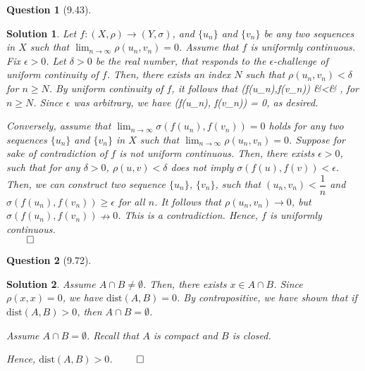 \documentclass{article} %
\def\eQb#1\eQe{\begin{eqnarray*}#1\end{eqnarray*}}
\theoremstyle{quest}
\newtheorem*{question}{Question}
\newtheorem*{solution}{Solution}
\begin{document}
\begin{question}[9.43]
\end{question}
\begin{solution}
Let $f:(X,\rho ) \to (Y, \sigma)$,
and $\{ u_n \}$ and 
$\{ v_n \}$ be any two sequences in $X$ such that $\lim_{n\to \infty}
\rho (u_n , v_n) = 0$. Assume that $f$ is uniformly continuous.
Fix $\epsilon > 0$. Let $\delta > 0$ be the real number, that
responds to the $\epsilon$-challenge of uniform continuity of $f$.
Then, there exists an index $N$ such that 
$\rho(u_n, v_n) < \delta$ for $n \geq N$. 
By uniform continuity of $f$, it follows that
\eQb
\sigma(f(u_n),f(v_n)) &<& \epsilon,
\eQe
for $n \geq N$. Since $\epsilon$ was arbitrary, we have
\eQb
\underset{n \to \infty}{\lim} \sigma(f(u_n), f(v_n)) = 0,
\eQe
as desired. 

\smallskip

Conversely, assume that $\lim_{n \to \infty}
\sigma(f(u_n),f(v_n)) = 0$ holds for any two sequences 
$\{u_n\}$ and $\{ v_n \}$ in $X$ such that $\lim_{n \to \infty}
\rho(u_n,v_n) = 0$. 
Suppose for sake of contradiction of $f$ is not uniform continuous. 
Then, there exists $\epsilon > 0$, such that for any $\delta > 0$,
$\rho(u,v) < \delta$ does not imply  $\sigma(f(u),f(v)) < \epsilon$. 
Then, we can construct two sequence $\{u_n\}$, $\{v_n\}$, such that 
$(u_n, v_n) < \dfrac{1}{n}$ and $\sigma(f(u_n),f(v_n)) \geq \epsilon$
for all $n$. It follows that $\rho(u_n,v_n) \to 0$, but 
$\sigma(f(u_n),f(v_n)) \nrightarrow 0$. This is a contradiction.
Hence, $f$ is uniformly continuous. \\ 
\hfill $\qed$  \\

\end{solution}

\bigskip

\begin{question}[9.72]
\end{question}
\begin{solution}
Assume $A \cap B \neq \emptyset$. Then, there exists $x \in A \cap B$.
Since $\rho(x,x) = 0$, we have $\text{dist}(A,B) = 0$. By contrapositive,
we have shown that if $\text{dist}(A,B) > 0$, then $A \cap B = \emptyset$. \\

\smallskip

Assume $A \cap B = \emptyset$. Recall that $A$ is compact and $B$ is closed. 

Hence, $\text{dist}(A,B) > 0$. $\qed$

\end{solution}
\end{document}
